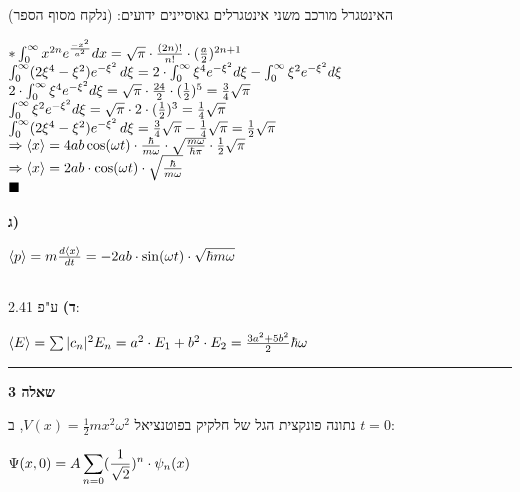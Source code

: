 \documentclass[14pt]{extarticle}
\makeatletter
\newenvironment{lefteqs}{%
    \begin{english}%
    \begin{flushleft}%
    \renewcommand{\arraystretch}{1.3}%
    $\begin{array}{@{}l@{}}%
}{%
    \end{array}$%
    \end{flushleft}%
    \end{english}%
}
\makeatother
\begin{document}
האינטגרל מורכב משני אינטגרלים גאוסיינים ידועים: (נלקח מסוף הספר)
\begin{lefteqs}
    * \int_{0}^{\infty} x^{2n} e^{\frac{-x^2}{a^2}} dx = \sqrt{\pi} \cdot \frac{(2n)!}{n!} \cdot (\frac{a}{2})^{2n+1} \\
    \int_{0}^{\infty} (2\xi^4 - \xi^2) e^{-\xi^2} \, d\xi = 2 \cdot \int_{0}^{\infty} \xi^4 e^{-\xi^2} d\xi - \int_{0}^{\infty} \xi^2 e^{-\xi^2} d\xi \\
    2 \cdot \int_{0}^{\infty} \xi^4 e^{-\xi^2} d\xi = \sqrt{\pi} \cdot \frac{24}{2} \cdot (\frac{1}{2})^5 = \frac{3}{4}\sqrt{\pi} \\
    \int_{0}^{\infty} \xi^2 e^{-\xi^2} d\xi = \sqrt{\pi} \cdot 2 \cdot (\frac{1}{2})^3 = \frac{1}{4}\sqrt{\pi} \\
    \int_{0}^{\infty} (2\xi^4 - \xi^2) e^{-\xi^2} \, d\xi = \frac{3}{4}\sqrt{\pi} - \frac{1}{4}\sqrt{\pi} = \frac{1}{2}\sqrt{\pi} \\
    \Rightarrow \langle x \rangle = 4ab \cos(\omega t) \cdot \frac{\hbar}{m\omega} \cdot \sqrt{\frac{m\omega}{\hbar \pi}} \cdot \frac{1}{2}\sqrt{\pi} \\
    \Rightarrow \langle x \rangle = 2ab \cdot \cos(\omega t) \cdot \sqrt{\frac{\hbar}{m\omega}} \\
    \blacksquare
\end{lefteqs}

\textbf{ג)}
\begin{lefteqs}
    \langle p \rangle = m \frac{d \langle x \rangle}{dt} = -2ab \cdot \sin(\omega t) \cdot \sqrt{\hbar m \omega} \\ \\
\end{lefteqs}

\textbf{ד)}
ע"פ 2.41:

\begin{lefteqs}
    \langle E \rangle = \sum |c_n|^2 E_n = a^2 \cdot E_1 + b^2 \cdot E_2 = \frac{3a^2 + 5b^2}{2} \hbar \omega
\end{lefteqs}

\vspace{3em}
\hrule
\vspace{2em}

\textbf{\large שאלה 3}

נתונה פונקצית הגל של חלקיק בפוטנציאל $V(x) = \frac{1}{2} mx^2\omega^2$, ב $t=0$:
\begin{lefteqs}
    \Psi(x,0) = A \displaystyle \sum_{n=0} (\frac{1}{\sqrt{2}})^n \cdot \psi_n(x)
\end{lefteqs}
\end{document}
